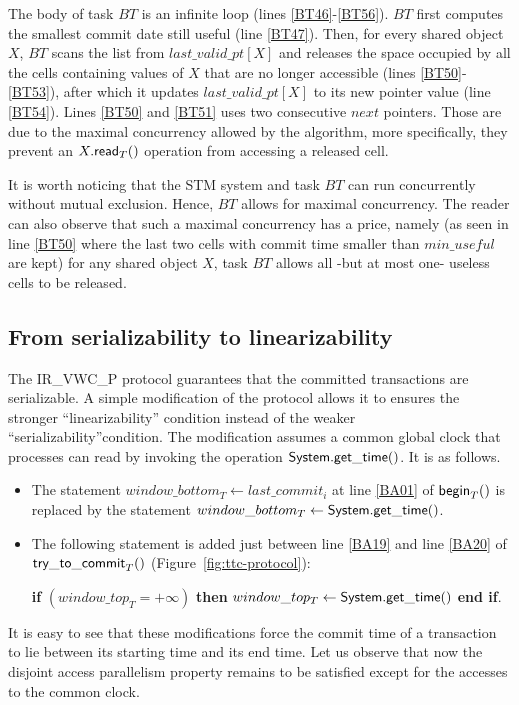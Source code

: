 The body of task $BT$ is an infinite loop (lines \ref{BT46}-\ref{BT56}). 
$BT$ first computes the smallest commit date still useful (line \ref{BT47}). 
Then, for every shared object $X$, $BT$ 
scans the list from $last\_valid\_pt[X]$ 
and releases the space occupied by all the cells containing 
values of $X$ that are no longer accessible (lines \ref{BT50}-\ref{BT53}), 
after which it  updates  $last\_valid\_pt[X]$ to its new pointer value
(line \ref{BT54}).  Lines \ref{BT50} and  \ref{BT51}
uses two consecutive $next$ pointers.  
Those  are   due  to  the   maximal  concurrency  allowed by the algorithm,
more specifically,   they  prevent an  $X.{\sf read}_T()$ operation from 
accessing a released cell.     


It is worth noticing that the STM system and task  $BT$ can run 
concurrently without mutual  exclusion. Hence, $BT$  allows for 
maximal concurrency.  The  reader can also observe that such a maximal 
concurrency has a price, namely (as  seen in line \ref{BT50} where the last
two cells with commit time smaller than $\mathit{min\_useful}$ are kept)
for any shared object $X$, task $BT$ allows all -but at most one-  useless
cells to be released.  





\subsection{From serializability to linearizability}
\label{sec:from-ser-to-lin}
The  IR\_VWC\_P protocol guarantees  that the committed transactions  are
serializable.   A simple modification of the protocol allows it to 
ensures the  stronger ``linearizability'' condition \cite{HW90} instead of 
the weaker  ``serializability''condition.  
The modification  assumes a common  global clock  that processes can read by
invoking  the operation ${\sf System.get\_time}()$. It is as follows. 
\begin{itemize}
\vspace{-0.2cm}
\item 
The statement  $window\_bottom_T \gets last\_commit_i$ 
at   line \ref{BA01} of  ${\sf begin}_T()$ is replaced by the statement 
 $window\_bottom_T \gets {\sf System.get\_time}()$. 
%     
\vspace{-0.2cm}
\item 
The following statement is added just between  line \ref{BA19} and line
 \ref{BA20}  of  ${\sf try\_to\_commit}_T()$ (Figure~\ref{fig:ttc-protocol}):\\
\centerline{{\bf if} $(window\_top_T = +\infty)$ {\bf then}
	      $window\_top_T \gets {\sf System.get\_time}()$ {\bf end if}.}

\end{itemize}
It is easy to see that these modifications force the  commit time of a 
transaction to  lie   between  its starting  time and its end time. 
Let us  observe that  now the disjoint access  parallelism property  
remains to be  satisfied  except for  the accesses to the common clock. 



